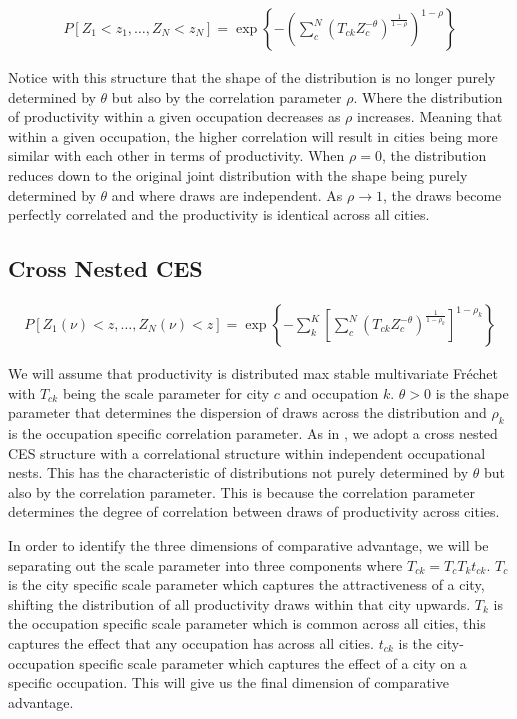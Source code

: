 \documentclass[10pt]{article}
\begin{document}
\begin{align*}
    P[Z_1 < z_1, \dots, Z_N < z_N] = \exp \left\{ - \left( \sum_{c}^{N} (T_{ck} Z_c^{- \theta})^{\frac{1}{1 - \rho}} \right)^{1 - \rho} \right\}
\end{align*}

Notice with this structure that the shape of the distribution is no longer purely determined by $\theta$ but also by the correlation parameter $\rho$. Where the distribution of productivity within a given occupation decreases as $\rho$ increases. Meaning that within a given occupation, the higher correlation will result in cities being more similar with each other in terms of productivity. When $\rho = 0$, the distribution reduces down to the original joint distribution with the shape being purely determined by $\theta$ and where draws are independent. As $\rho \rightarrow 1$, the draws become perfectly correlated and the productivity is identical across all cities.

\subsection{Cross Nested CES}

\begin{align}
    P[Z_1(\nu) < z, \dots, Z_N(\nu) < z] = \exp \left\{ - \sum_{k}^{K} \left[ \sum_{c}^{N} (T_{ck} Z_c^{- \theta})^{\frac{1}{1 - \rho_k}} \right]^{1 - \rho_k} \right\}
\end{align}

We will assume that productivity is distributed max stable multivariate Fr\'{e}chet with $T_{ck}$ being the scale parameter for city $c$ and occupation $k$. $\theta > 0$ is the shape parameter that determines the dispersion of draws across the distribution and $\rho_k$ is the occupation specific correlation parameter. As in \cite{lindandramondo}, we adopt a cross nested CES structure with a correlational structure within independent occupational nests. This has the characteristic of distributions not purely determined by $\theta$ but also by the correlation parameter. This is because the correlation parameter determines the degree of correlation between draws of productivity across cities.

In order to identify the three dimensions of comparative advantage, we will be separating out the scale parameter into three components where $T_{ck} = T_c T_k t_{ck}$. $T_c$ is the city specific scale parameter which captures the attractiveness of a city, shifting the distribution of all productivity draws within that city upwards. $T_k$ is the occupation specific scale parameter which is common across all cities, this captures the effect that any occupation has across all cities. $t_{ck}$ is the city-occupation specific scale parameter which captures the effect of a city on a specific occupation. This will give us the final dimension of comparative advantage.
\end{document}
